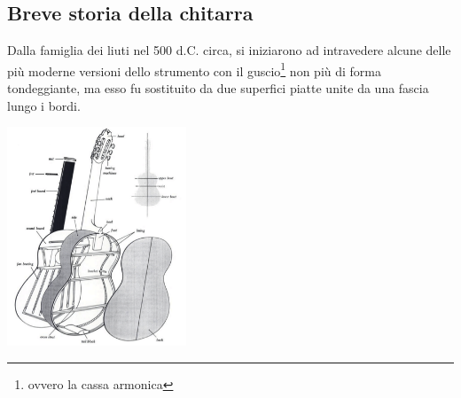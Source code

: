 \documentclass[oneside]{article}
\begin{document}
\begin{multicols*}{2}

\section{ Breve storia della chitarra}
\hspace*{10mm}

Dalla famiglia dei liuti nel 500 d.C. circa, si iniziarono ad intravedere alcune delle più moderne versioni dello strumento con il guscio\footnote{ovvero la cassa armonica} non più di forma tondeggiante, ma esso fu sostituito da due superfici piatte unite da una fascia lungo i bordi.

\includegraphics[width=0.4\textwidth]{img/chit_spaccato.png}


\end{multicols*}
\end{document}
